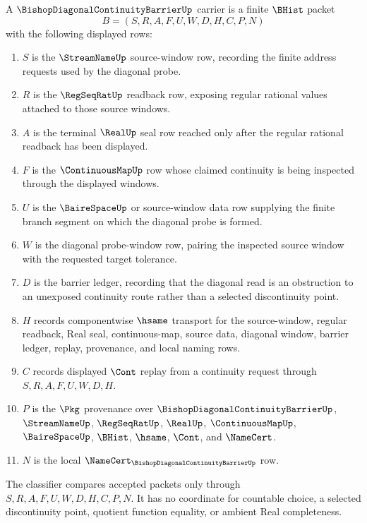 \begin{definition}
\label{def:bishop-diagonal-continuity-barrier-carrier}
A $\BishopDiagonalContinuityBarrierUp$ carrier is a finite $\BHist$ packet
$$
B=(S,R,A,F,U,W,D,H,C,P,N)
$$
with the following displayed rows:
\begin{enumerate}
\item $S$ is the $\StreamNameUp$ source-window row, recording the finite address requests used by the diagonal probe.
\item $R$ is the $\RegSeqRatUp$ readback row, exposing regular rational values attached to those source windows.
\item $A$ is the terminal $\RealUp$ seal row reached only after the regular rational readback has been displayed.
\item $F$ is the $\ContinuousMapUp$ row whose claimed continuity is being inspected through the displayed windows.
\item $U$ is the $\BaireSpaceUp$ or source-window data row supplying the finite branch segment on which the diagonal probe is formed.
\item $W$ is the diagonal probe-window row, pairing the inspected source window with the requested target tolerance.
\item $D$ is the barrier ledger, recording that the diagonal read is an obstruction to an unexposed continuity route rather than a selected discontinuity point.
\item $H$ records componentwise $\hsame$ transport for the source-window, regular readback, Real seal, continuous-map, source data, diagonal window, barrier ledger, replay, provenance, and local naming rows.
\item $C$ records displayed $\Cont$ replay from a continuity request through $S,R,A,F,U,W,D,H$.
\item $P$ is the $\Pkg$ provenance over $\BishopDiagonalContinuityBarrierUp$, $\StreamNameUp$, $\RegSeqRatUp$, $\RealUp$, $\ContinuousMapUp$, $\BaireSpaceUp$, $\BHist$, $\hsame$, $\Cont$, and $\NameCert$.
\item $N$ is the local $\NameCert_{\BishopDiagonalContinuityBarrierUp}$ row.
\end{enumerate}
The classifier compares accepted packets only through $S,R,A,F,U,W,D,H,C,P,N$. It has no coordinate for countable choice, a selected discontinuity point, quotient function equality, or ambient Real completeness.
\end{definition}

